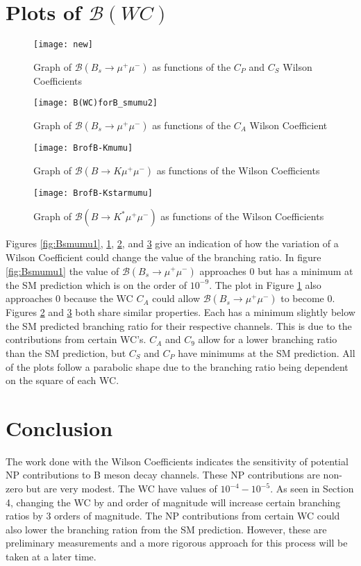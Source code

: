 \documentclass[12pt]{article}
\begin{document}
\section{Plots of $\mathcal{B}(WC)$}
\begin{figure}[htbp!]
\centering
\texttt{[image: new]}
\caption{Graph of $\mathcal{B}(B_s\rightarrow \mu^+\mu^-)$ as functions of the $C_P$ and $C_S$ Wilson Coefficients}
\label{fig:Bsmumu1}
\centering
\texttt{[image: B(WC)forB\_smumu2]}
\caption{Graph of $\mathcal{B}(B_s\rightarrow \mu^+\mu^-)$ as functions of the $C_A$ Wilson Coefficient}
\label{fig:Bsmumu2}
\end{figure}
\begin{figure}[htbp!]
\centering
\texttt{[image: BrofB-Kmumu]}
\caption{Graph of $\mathcal{B}(B\rightarrow K\mu^+\mu^-)$ as functions of the Wilson Coefficients}
\label{fig:Bkmumu}
\end{figure}
\begin{figure}
\centering
\texttt{[image: BrofB-Kstarmumu]}
\caption{Graph of $\mathcal{B}(B\rightarrow K^*\mu^+\mu^-)$ as functions of the Wilson Coefficients}
\label{fig:bKstarmumu}
\end{figure}
Figures \ref{fig:Bsmumu1}, \ref{fig:Bsmumu2}, \ref{fig:Bkmumu}, and \ref{fig:bKstarmumu} give an indication of how the variation of a Wilson Coefficient could change the value of the branching ratio. In figure \ref{fig:Bsmumu1} the value of $\mathcal{B}(B_s \rightarrow \mu^+ \mu^-)$ approaches 0 but has a minimum at the SM prediction which is on the order of $10^{-9}$. The plot in Figure \ref{fig:Bsmumu2} also approaches 0 because the WC $C_A$ could allow $\mathcal{B}(B_s \rightarrow \mu^+ \mu ^-)$ to become 0. Figures \ref{fig:Bkmumu} and \ref{fig:bKstarmumu} both share similar properties. Each has a minimum slightly below the SM predicted branching ratio for their respective channels. This is due to the contributions from certain WC's. $C_A$ and $C_9$ allow for a lower branching ratio than the SM prediction, but $C_S$ and $C_P$ have minimums at the SM prediction. All of the plots follow a parabolic shape due to the branching ratio being dependent on the square of each WC.
\newpage
\section{Conclusion}
The work done with the Wilson Coefficients indicates the sensitivity of potential NP contributions to B meson decay channels. These NP contributions are non-zero but are very modest. The WC have values of $10^{-4} - 10^{-5}$. As seen in Section 4, changing the WC by and order of magnitude will increase certain branching ratios by 3 orders of magnitude. The NP contributions from certain WC could also lower the branching ration from the SM prediction. However, these are preliminary measurements and a more rigorous approach for this process will be taken at a later time.    
\end{document}
